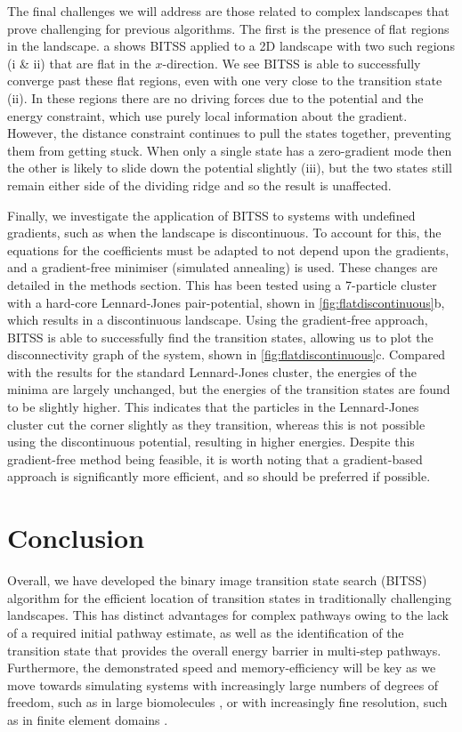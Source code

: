 \documentclass[twocolumn,10pt]{revtex4}
\begin{document}
The final challenges we will address are those related to complex landscapes that prove challenging for previous algorithms.
The first is the presence of flat regions in the landscape.
a shows BITSS applied to a 2D landscape with two such regions (i \& ii) that are flat in the $x$-direction.
We see BITSS is able to successfully converge past these flat regions, even with one very close to the transition state (ii).
In these regions there are no driving forces due to the potential and the energy constraint, which use purely local information about the gradient.
However, the distance constraint continues to pull the states together, preventing them from getting stuck.
When only a single state has a zero-gradient mode then the other is likely to slide down the potential slightly (iii), but the two states still remain either side of the dividing ridge and so the result is unaffected.

Finally, we investigate the application of BITSS to systems with undefined gradients, such as when the landscape is discontinuous.
To account for this, the equations for the coefficients must be adapted to not depend upon the gradients, and a gradient-free minimiser (simulated annealing) is used.
These changes are detailed in the methods section.
This has been tested using a 7-particle cluster with a hard-core Lennard-Jones pair-potential, shown in \cref{fig:flatdiscontinuous}b, which results in a discontinuous landscape.
Using the gradient-free approach, BITSS is able to successfully find the transition states, allowing us to plot the disconnectivity graph of the system, shown in \cref{fig:flatdiscontinuous}c.
Compared with the results for the standard Lennard-Jones cluster, the energies of the minima are largely unchanged, but the energies of the transition states are found to be slightly higher.
This indicates that the particles in the Lennard-Jones cluster cut the corner slightly as they transition, whereas this is not possible using the discontinuous potential, resulting in higher energies.
Despite this gradient-free method being feasible, it is worth noting that a gradient-based approach is significantly more efficient, and so should be preferred if possible.


\section{Conclusion}
Overall, we have developed the binary image transition state search (BITSS) algorithm for the efficient location of transition states in traditionally challenging landscapes.
This has distinct advantages for complex pathways owing to the lack of a required initial pathway estimate, as well as the identification of the transition state that provides the overall energy barrier in multi-step pathways.
Furthermore, the demonstrated speed and memory-efficiency will be key as we move towards simulating systems with increasingly large numbers of degrees of freedom, such as in large biomolecules \cite{Lee2018}, or with increasingly fine resolution, such as in finite element domains \cite{Kolev2021}.
\end{document}
